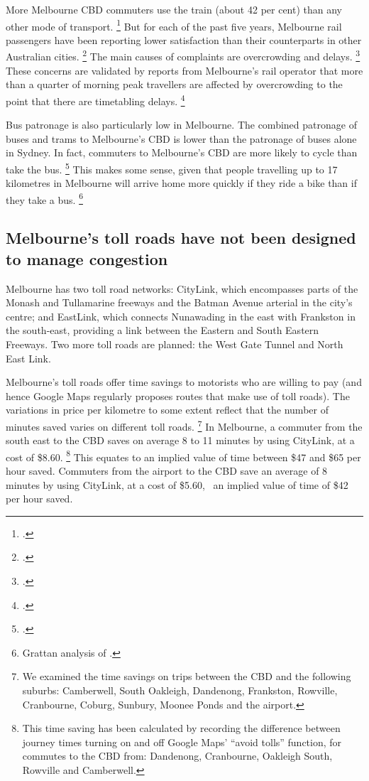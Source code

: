 \documentclass{grattan}
\begin{document}
More Melbourne CBD commuters use the train (about 42 per cent) than any other mode of transport.%
\footcite{ABS2011Census}
But for each of the past five years, Melbourne rail passengers have been reporting lower satisfaction than their counterparts in other Australian cities.%
    \footcite{Downes-2016-Metro-trains-pax-ratings}
The main causes of complaints are overcrowding and delays.%
   \footcite{Downes-2016-Metro-trains-pax-ratings}
These concerns are validated by reports from Melbourne's rail operator that more than a quarter of morning peak travellers are affected by overcrowding to the point that there are timetabling delays.%
\footcite{2016-Train-Load-Survey-Report}





Bus patronage is also particularly low in Melbourne.
The combined patronage of buses and trams to Melbourne's CBD is lower than the patronage of buses alone in Sydney.
In fact, commuters to Melbourne's CBD are more likely to cycle than take the bus.%
\footcite{ABS2011Census}
This makes some sense, given that people travelling up to 17 kilometres in Melbourne will arrive home more quickly if they ride a bike than if they take a bus.%
    \footnote{Grattan analysis of \textcite{VISTA}.}


\subsection{Melbourne's toll roads have not been designed to manage congestion}

Melbourne has two toll road networks:  CityLink, which encompasses parts of the Monash and Tullamarine freeways and the Batman Avenue arterial in the city's centre; and EastLink, which connects Nunawading in the east with Frankston in the south-east, providing a link between the Eastern and South Eastern Freeways.
Two more toll roads are planned: the West Gate Tunnel and North East Link.

Melbourne's toll roads offer time savings to motorists who are willing to pay (and hence Google Maps regularly proposes routes that make use of toll roads). The variations in price per kilometre to some extent reflect that the number of minutes saved varies on different toll roads.%
    \footnote{We examined the time savings on trips between the CBD and the following suburbs: Camberwell, South Oakleigh, Dandenong, Frankston, Rowville, Cranbourne, Coburg, Sunbury, Moonee Ponds and the airport.}
In Melbourne, a commuter from the south east to the CBD saves on average 8 to 11 minutes by using CityLink, at a cost of \$8.60.%
    \footnote{This time saving has been calculated by recording the difference between journey times turning on and off Google Maps' ``avoid tolls'' function, for commutes to the CBD from: Dandenong, Cranbourne, Oakleigh South, Rowville and Camberwell.}
This equates to an implied value of time between \$47 and \$65 per hour saved.
Commuters from the airport to the CBD save an average of 8 minutes by using CityLink, at a cost of \$5.60, \ie~an implied value of time of \$42 per hour saved.
\end{document}

